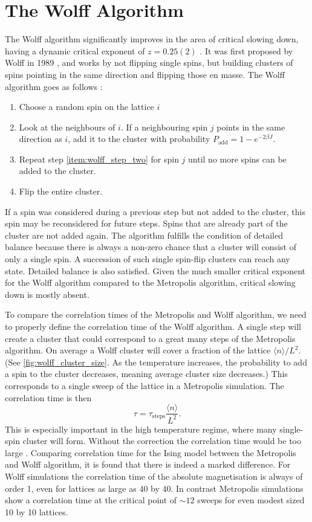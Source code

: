 \documentclass[11pt, a4paper]{report} %
\begin{document}
\section{The Wolff Algorithm}
The Wolff algorithm significantly improves in the area of critical slowing down, having a dynamic critical exponent of \(z=0.25(2)\) \cite{newman:1999}.
It was first proposed by Wolff in 1989 \cite{wolff:1989}, and works by not flipping single spins, but building clusters of spins pointing in the same direction and flipping those en masse.
The Wolff algorithm goes as follows \cite{landau:2015,newman:1999}:
\begin{enumerate}
	\item Choose a random spin on the lattice \(i\)
	\item\label{item:wolff_step_two} Look at the neighbours of \(i\). If a neighbouring spin \(j\) points in the same direction as \(i\), add it to the cluster with probability \(P_{\mathrm{add}} = 1 - e^{-2\beta J}\).
	\item Repeat step \ref{item:wolff_step_two} for spin \(j\) until no more spins can be added to the cluster.
	\item Flip the entire cluster.
\end{enumerate}
If a spin was considered during a previous step but not added to the cluster, this spin may be reconsidered for future steps.
Spins that are already part of the cluster are not added again.
The algorithm fulfills the condition of detailed balance because there is always a non-zero chance that a cluster will consist of only a single spin.
A succession of such single spin-flip clusters can reach any state. Detailed balance is also satisfied.
Given the much smaller critical exponent for the Wolff algorithm compared to the Metropolis algorithm, critical slowing down is mostly absent.

To compare the correlation times of the Metropolis and Wolff algorithm, we need to properly define the correlation time of the Wolff algorithm.
A single step will create a cluster that could correspond to a great many steps of the Metropolis algorithm.
On average a Wolff cluster will cover a fraction of the lattice \(\langle n \rangle / L^2\). (See \cref{fig:wolff_cluster_size}. As the temperature increases, the probability to add a spin to the cluster decreases, meaning average cluster size decreases.)
This corresponds to a single sweep of the lattice in a Metropolis simulation.
The correlation time is then
\begin{equation}
	\tau = \tau_{\mathrm{steps}} \frac{\langle n \rangle}{L^2}.
\end{equation}
This is especially important in the high temperature regime, where many single-spin cluster will form.
Without the correction the correlation time would be too large \cite{newman:1999}.
Comparing correlation time for the Ising model between the Metropolis and Wolff algorithm, it is found that there is indeed a marked difference.
For Wolff simulations the correlation time of the absolute magnetisation is always of order 1, even for lattices as large as 40 by 40.
In contrast Metropolis simulations show a correlation time at the critical point of \(\sim 12\) sweeps for even modest sized 10 by 10 lattices.
\end{document}
